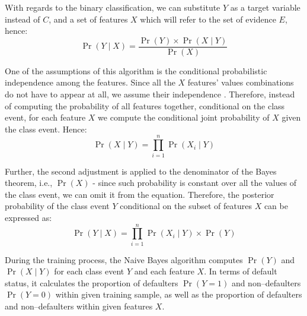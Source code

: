 With regards to the binary classification, we can substitute $Y$ as a target variable instead of $C$, and a set of features $X$ which will refer to the set of evidence $E$, hence:
\begin{equation}\label{eq}
    \operatorname{Pr}\left(Y \mid X \right) = \frac{\operatorname{Pr}\left(Y\right) \times \operatorname{Pr}\left(X \mid Y \right)}{\operatorname{Pr}\left(X\right)}
\end{equation}

One of the assumptions of this algorithm is the conditional probabilistic independence among the features.
Since all the $X$ features' values combinations do not have to appear at all, we assume their independence \citep{cichosz2014data}.
Therefore, instead of computing the probability of all features together, conditional on the class event, for each feature $X$ we compute the conditional joint probability of $X$ given the class event. Hence:
\begin{equation}\label{eq}
    \operatorname{Pr}\left(X  \mid Y \right) = \prod_{i=1}^{n} \operatorname{Pr}\left(X_i \mid Y\right)
\end{equation}

Further, the second adjustment is applied to the denominator of the Bayes theorem, i.e., $\operatorname{Pr}\left(X\right)$ - since such probability is constant over all the values of the class event, we can omit it from the equation. Therefore, the posterior probability of the class event $Y$ conditional on the subset of features $X$ can be expressed as:
\begin{equation}\label{eq}
    \operatorname{Pr}\left(Y \mid X \right) = \prod_{i=1}^{n} \operatorname{Pr}\left(X_i \mid Y\right) \times \operatorname{Pr}\left(Y\right)
\end{equation}

During the training process, the Naive Bayes algorithm computes $\operatorname{Pr}\left(Y\right)$ and $ \operatorname{Pr}\left(X \mid Y \right)$ for each class event $Y$ and each feature $X$.
In terms of default status, it calculates the proportion of defaulters $\operatorname{Pr}\left(Y = 1\right)$ and non--defaulters $\operatorname{Pr}\left(Y=0\right)$ within given training sample, as well as the proportion of defaulters and non--defaulters within given features $X$.


